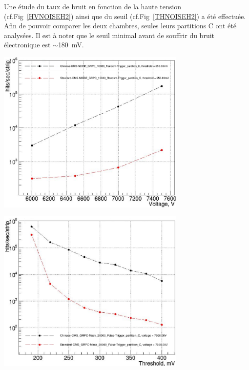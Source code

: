Une étude du taux de bruit en fonction de la haute tension (cf.Fig~\ref{HVNOISEH2}) ainsi que du seuil (cf.Fig~\ref{THNOISEH2}) a été effectuée. Afin de pouvoir comparer les deux chambres, seules leurs partitions C ont été analysées.
Il est à noter que le seuil minimal avant de souffrir du bruit électronique est $\sim$\SI{180}{\milli\volt}.

\noindent
\begin{minipage}[th!]{0.98\textwidth}
	\noindent
	\centering
	\includegraphics[width=0.70\textwidth]{GLA/HVNOISEH2.png}
	\label{HVNOISEH2}
\end{minipage}%


\noindent
\begin{minipage}[th!]{0.98\textwidth}
	\noindent
	\centering
	\includegraphics[width=0.70\textwidth]{GLA/THNOISEH2.png}
	\label{THNOISEH2}
\end{minipage}%

